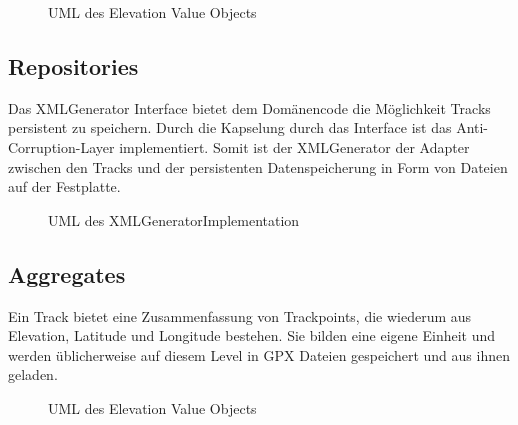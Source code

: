 \begin{figure}[H]
  \centering
  
  \caption{UML des Elevation Value Objects}
\end{figure}

\subsection{Repositories}

Das XMLGenerator Interface bietet dem Domänencode die Möglichkeit Tracks persistent zu speichern. Durch die Kapselung durch das Interface ist das Anti-Corruption-Layer implementiert.
Somit ist der XMLGenerator der Adapter zwischen den Tracks und der persistenten Datenspeicherung in Form von Dateien auf der Festplatte.

\begin{figure}[H]
  \centering
  
  \caption{UML des XMLGeneratorImplementation}
\end{figure}

\subsection{Aggregates}

Ein Track bietet eine Zusammenfassung von Trackpoints, die wiederum aus Elevation, Latitude und Longitude bestehen. Sie bilden eine eigene Einheit und werden üblicherweise auf diesem Level in GPX Dateien gespeichert und aus ihnen geladen.

\begin{figure}[H]
  \centering
  
  \caption{UML des Elevation Value Objects}
\end{figure}